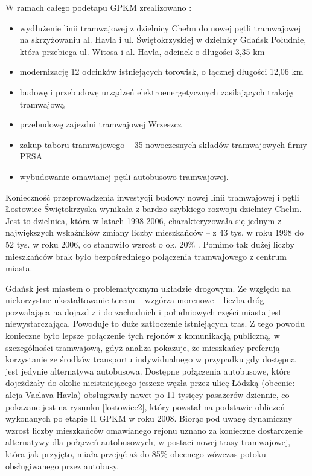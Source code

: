 \documentclass[twoside,12pt]{article}
\begin{document}
	\begin{samepage}
	W ramach całego podetapu GPKM zrealizowano \cite{portal_gdansk}:
	\begin{itemize}\setlength{\itemsep}{0em}
	\item wydłużenie linii tramwajowej z dzielnicy Chełm do nowej pętli tramwajowej na skrzyżowaniu al. Havla i ul. Świętokrzyskiej w dzielnicy Gdańsk Południe, która przebiega ul. Witosa i al. Havla, odcinek o długości 3,35 km
	\item modernizację 12 odcinków istniejących torowisk, o łącznej długości 12,06 km
	\item budowę i przebudowę urządzeń elektroenergetycznych zasilających trakcję tramwajową
	\item przebudowę zajezdni tramwajowej Wrzeszcz
	\item zakup taboru tramwajowego – 35 nowoczesnych składów tramwajowych firmy PESA
	\item wybudowanie omawianej pętli autobusowo-tramwajowej.
	\end{itemize}\end{samepage}
	
	Konieczność przeprowadzenia inwestycji budowy nowej linii tramwajowej i pętli Łostowice-Świętokrzyska wynikała z bardzo szybkiego rozwoju dzielnicy Chełm. Jest to dzielnica, która w latach 1998-2006, charakteryzowała się jednym z największych wskaźników zmiany liczby mieszkańców -- z 43 tys. w roku 1998 do 52 tys. w roku 2006, co stanowiło wzrost o ok. 20\% \cite{opracowanie_gdansk}. Pomimo tak dużej liczby mieszkańców brak było bezpośredniego połączenia tramwajowego z centrum miasta.
	
	Gdańsk jest miastem o problematycznym układzie drogowym. Ze względu na niekorzystne ukształtowanie terenu -- wzgórza morenowe -- liczba dróg pozwalająca na dojazd z i do zachodnich i południowych części miasta jest niewystarczająca. Powoduje to duże zatłoczenie istniejących tras. Z tego powodu konieczne było lepsze połączenie tych rejonów z komunikacją publiczną, w szczególności tramwajową, gdyż analiza pokazuje, że mieszkańcy preferują korzystanie ze środków transportu indywidualnego w przypadku gdy dostępna jest jedynie alternatywa autobusowa. Dostępne połączenia autobusowe, które dojeżdżały do okolic nieistniejącego jeszcze węzła przez ulicę Łódzką (obecnie: aleja Vaclava Havla) obsługiwały nawet po 11 tysięcy pasażerów dziennie, co pokazane jest na rysunku \ref{lostowice2}, który powstał na podstawie obliczeń wykonanych po etapie II GPKM w roku 2008. Biorąc pod uwagę dynamiczny wzrost liczby mieszkańców omawianego rejonu uznano za konieczne dostarczenie alternatywy dla połączeń autobusowych, w postaci nowej trasy tramwajowej, która jak przyjęto, miała przejąć aż do 85\% obecnego wówczas potoku obsługiwanego przez autobusy.
	
\end{document}
